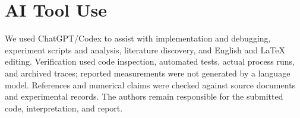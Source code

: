\section{AI Tool Use}
We used ChatGPT/Codex to assist with implementation and debugging,
experiment scripts and analysis, literature discovery, and English and
LaTeX editing. Verification used code inspection, automated tests, actual
process runs, and archived traces; reported measurements were not generated
by a language model. References and numerical claims were checked against
source documents and experimental records. The authors remain responsible
for the submitted code, interpretation, and report.
